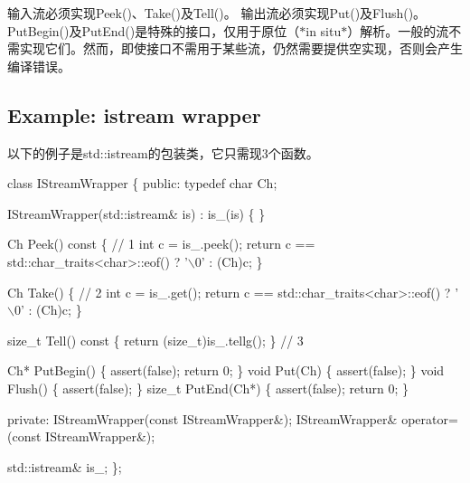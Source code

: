 输入流必须实现{\ttfamily Peek()}、{\ttfamily Take()}及{\ttfamily Tell()}。 输出流必须实现{\ttfamily Put()}及{\ttfamily Flush()}。 {\ttfamily Put\+Begin()}及{\ttfamily Put\+End()}是特殊的接口，仅用于原位（$\ast$in situ$\ast$）解析。一般的流不需实现它们。然而，即使接口不需用于某些流，仍然需要提供空实现，否则会产生编译错误。\hypertarget{md_Commun_Externe_RapidJSON_doc_stream.zh-cn_ExampleIStreamWrapper}{}\subsection{Example\+: istream wrapper}\label{md_Commun_Externe_RapidJSON_doc_stream.zh-cn_ExampleIStreamWrapper}
以下的例子是{\ttfamily std\+::istream}的包装类，它只需现3个函数。


\begin{DoxyCode}
\textcolor{keyword}{class }IStreamWrapper \{
\textcolor{keyword}{public}:
    \textcolor{keyword}{typedef} \textcolor{keywordtype}{char} Ch;

    IStreamWrapper(std::istream& is) : is\_(is) \{
    \}

    Ch Peek()\textcolor{keyword}{ const }\{ \textcolor{comment}{// 1}
        \textcolor{keywordtype}{int} c = is\_.peek();
        \textcolor{keywordflow}{return} c == std::char\_traits<char>::eof() ? \textcolor{charliteral}{'\(\backslash\)0'} : (Ch)c;
    \}

    Ch Take() \{ \textcolor{comment}{// 2}
        \textcolor{keywordtype}{int} c = is\_.get();
        \textcolor{keywordflow}{return} c == std::char\_traits<char>::eof() ? \textcolor{charliteral}{'\(\backslash\)0'} : (Ch)c;
    \}

    \textcolor{keywordtype}{size\_t} Tell()\textcolor{keyword}{ const }\{ \textcolor{keywordflow}{return} (\textcolor{keywordtype}{size\_t})is\_.tellg(); \} \textcolor{comment}{// 3}

    Ch* PutBegin() \{ assert(\textcolor{keyword}{false}); \textcolor{keywordflow}{return} 0; \}
    \textcolor{keywordtype}{void} Put(Ch) \{ assert(\textcolor{keyword}{false}); \}
    \textcolor{keywordtype}{void} Flush() \{ assert(\textcolor{keyword}{false}); \}
    \textcolor{keywordtype}{size\_t} PutEnd(Ch*) \{ assert(\textcolor{keyword}{false}); \textcolor{keywordflow}{return} 0; \}

\textcolor{keyword}{private}:
    IStreamWrapper(\textcolor{keyword}{const} IStreamWrapper&);
    IStreamWrapper& operator=(\textcolor{keyword}{const} IStreamWrapper&);

    std::istream& is\_;
\};
\end{DoxyCode}


